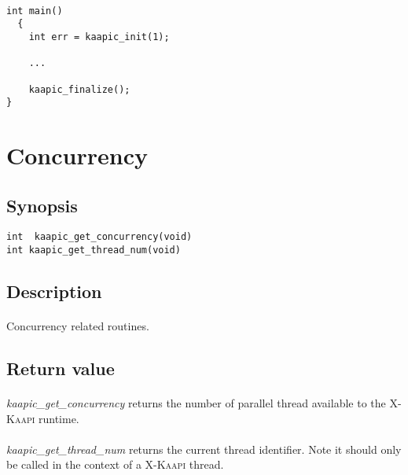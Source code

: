 \documentclass[a4paper, 11pt]{article}
\newcommand{\kaapi}{\textsc{X-Kaapi}\xspace}
\begin{document}
\paragraph{}
\begin{small}
\begin{lstlisting}[frame=tb]
  int main()
  {
    int err = kaapic_init(1);

    ...

    kaapic_finalize();
}
\end{lstlisting}
\end{small}


\newpage
\section{Concurrency}

\subsection{Synopsis}
\begin{small}
\lstset{language=C}
\begin{lstlisting}[frame=tb]
int  kaapic_get_concurrency(void)
int kaapic_get_thread_num(void)
\end{lstlisting}
\end{small}

\subsection{Description}
\paragraph{}
Concurrency related routines.

\subsection{Return value}
\paragraph{}
\textit{kaapic\_get\_concurrency} returns the number of parallel thread available
to the \kaapi runtime.
\paragraph{}
\textit{kaapic\_get\_thread\_num} returns the current thread identifier. Note it
should only be called in the context of a \kaapi thread.
\end{document}
